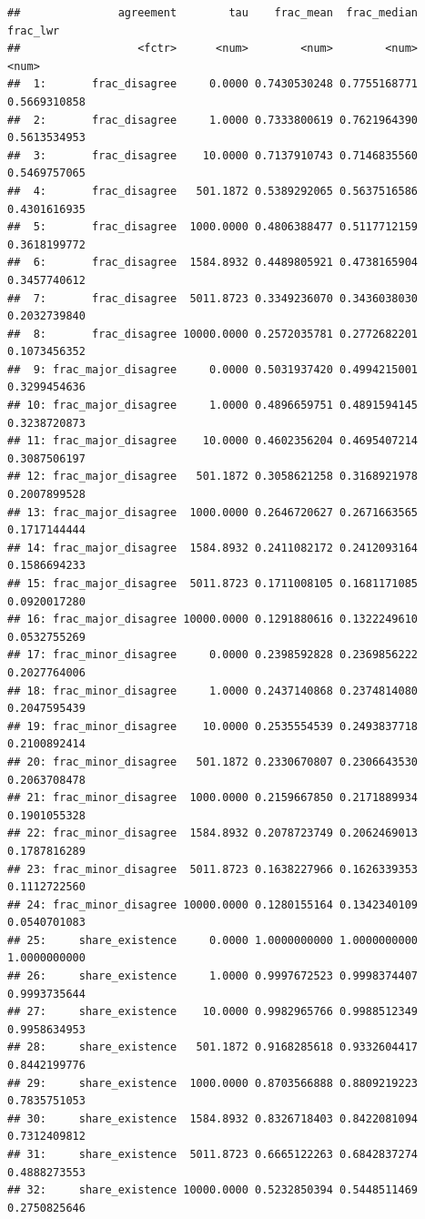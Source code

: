 \documentclass[
  11pt,
]{article}
\begin{document}
\begin{verbatim}
##               agreement        tau    frac_mean  frac_median     frac_lwr
##                  <fctr>      <num>        <num>        <num>        <num>
##  1:       frac_disagree     0.0000 0.7430530248 0.7755168771 0.5669310858
##  2:       frac_disagree     1.0000 0.7333800619 0.7621964390 0.5613534953
##  3:       frac_disagree    10.0000 0.7137910743 0.7146835560 0.5469757065
##  4:       frac_disagree   501.1872 0.5389292065 0.5637516586 0.4301616935
##  5:       frac_disagree  1000.0000 0.4806388477 0.5117712159 0.3618199772
##  6:       frac_disagree  1584.8932 0.4489805921 0.4738165904 0.3457740612
##  7:       frac_disagree  5011.8723 0.3349236070 0.3436038030 0.2032739840
##  8:       frac_disagree 10000.0000 0.2572035781 0.2772682201 0.1073456352
##  9: frac_major_disagree     0.0000 0.5031937420 0.4994215001 0.3299454636
## 10: frac_major_disagree     1.0000 0.4896659751 0.4891594145 0.3238720873
## 11: frac_major_disagree    10.0000 0.4602356204 0.4695407214 0.3087506197
## 12: frac_major_disagree   501.1872 0.3058621258 0.3168921978 0.2007899528
## 13: frac_major_disagree  1000.0000 0.2646720627 0.2671663565 0.1717144444
## 14: frac_major_disagree  1584.8932 0.2411082172 0.2412093164 0.1586694233
## 15: frac_major_disagree  5011.8723 0.1711008105 0.1681171085 0.0920017280
## 16: frac_major_disagree 10000.0000 0.1291880616 0.1322249610 0.0532755269
## 17: frac_minor_disagree     0.0000 0.2398592828 0.2369856222 0.2027764006
## 18: frac_minor_disagree     1.0000 0.2437140868 0.2374814080 0.2047595439
## 19: frac_minor_disagree    10.0000 0.2535554539 0.2493837718 0.2100892414
## 20: frac_minor_disagree   501.1872 0.2330670807 0.2306643530 0.2063708478
## 21: frac_minor_disagree  1000.0000 0.2159667850 0.2171889934 0.1901055328
## 22: frac_minor_disagree  1584.8932 0.2078723749 0.2062469013 0.1787816289
## 23: frac_minor_disagree  5011.8723 0.1638227966 0.1626339353 0.1112722560
## 24: frac_minor_disagree 10000.0000 0.1280155164 0.1342340109 0.0540701083
## 25:     share_existence     0.0000 1.0000000000 1.0000000000 1.0000000000
## 26:     share_existence     1.0000 0.9997672523 0.9998374407 0.9993735644
## 27:     share_existence    10.0000 0.9982965766 0.9988512349 0.9958634953
## 28:     share_existence   501.1872 0.9168285618 0.9332604417 0.8442199776
## 29:     share_existence  1000.0000 0.8703566888 0.8809219223 0.7835751053
## 30:     share_existence  1584.8932 0.8326718403 0.8422081094 0.7312409812
## 31:     share_existence  5011.8723 0.6665122263 0.6842837274 0.4888273553
## 32:     share_existence 10000.0000 0.5232850394 0.5448511469 0.2750825646

\end{verbatim}
\end{document}
